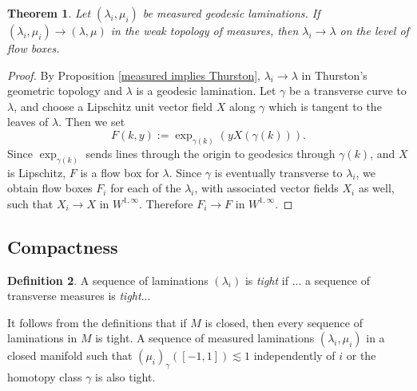 \documentclass[reqno,10pt]{amsart}
\newcommand{\dfn}[1]{\emph{#1}\index{#1}}
\newtheorem{theorem}{Theorem}[section]
\theoremstyle{definition}
\newtheorem{definition}[theorem]{Definition}
\numberwithin{equation}{section}
\begin{document}
\begin{theorem}
Let $(\lambda_i, \mu_i)$ be measured geodesic laminations.
If $(\lambda_i, \mu_i) \to (\lambda, \mu)$ in the weak topology of measures, then $\lambda_i \to \lambda$ on the level of flow boxes.
\end{theorem}
\begin{proof}
By Proposition \ref{measured implies Thurston}, $\lambda_i \to \lambda$ in Thurston's geometric topology and $\lambda$ is a geodesic lamination.
Let $\gamma$ be a transverse curve to $\lambda$, and choose a Lipschitz unit vector field $X$ along $\gamma$ which is tangent to the leaves of $\lambda$.
Then we set
$$F(k, y) := \exp_{\gamma(k)}(yX(\gamma(k))).$$
Since $\exp_{\gamma(k)}$ sends lines through the origin to geodesics through $\gamma(k)$, and $X$ is Lipschitz, $F$ is a flow box for $\lambda$.
Since $\gamma$ is eventually transverse to $\lambda_i$, we obtain flow boxes $F_i$ for each of the $\lambda_i$, with associated vector fields $X_i$ as well, such that $X_i \to X$ in $W^{1, \infty}$. Therefore $F_i \to F$ in $W^{1, \infty}$.
\end{proof}

\subsection{Compactness}
\begin{definition}
A sequence of laminations $(\lambda_i)$ is \dfn{tight} if ... a sequence of transverse measures is \dfn{tight}...
\end{definition}

It follows from the definitions that if $M$ is closed, then every sequence of laminations in $M$ is tight.
A sequence of measured laminations $(\lambda_i, \mu_i)$ in a closed manifold such that $(\mu_i)_\gamma([-1, 1]) \lesssim 1$ independently of $i$ or the homotopy class $\gamma$ is also tight.
\end{document}
